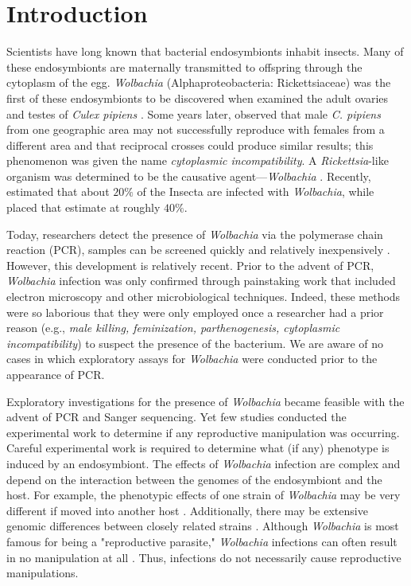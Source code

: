 \documentclass{frontiersSCNS}
\begin{document}
\section{Introduction}
Scientists have long known that bacterial endosymbionts inhabit insects. Many of these endosymbionts are maternally transmitted to offspring through the cytoplasm of the egg. \textit{Wolbachia} (Alphaproteobacteria: Rickettsiaceae) was the first of these endosymbionts to be discovered when \citet{Hertig:1924wy} examined the adult ovaries and testes of \textit{Culex pipiens} \citep[hence the specific epithet of \textit{Wolbachia pipientis}; ][]{Hertig:1936}. Some years later, \citet{Yen:1971tc} observed that male \textit{C. pipiens} from one geographic area may not successfully reproduce with females from a different area and that reciprocal crosses could produce similar results; this phenomenon was given the name \textit{cytoplasmic incompatibility}. A \textit{Rickettsia}-like organism was determined to be the causative agent---\textit{Wolbachia} \citep{Yen:1973vx}. Recently, \cite{Hilgenboecker:2008aa} estimated that about $20\%$ of the Insecta  are infected with \emph{Wolbachia}, while \cite{Zug:2012bi}  placed that estimate at roughly $40\%$. 

Today, researchers detect the presence of \textit{Wolbachia} via the polymerase chain reaction (PCR), samples can be screened quickly and relatively inexpensively \citep{Baldo:2006p7025,Simoes:2011p11073}. However, this development is relatively recent. Prior to the advent of PCR, \textit{Wolbachia} infection was only confirmed through painstaking work that included electron microscopy and other microbiological techniques. Indeed, these methods were so laborious that they were only employed once a researcher had a prior reason (e.g., \emph{male killing, feminization, parthenogenesis, cytoplasmic incompatibility}) to suspect the presence of the bacterium. We are aware of no cases in which exploratory assays for \textit{Wolbachia} were conducted prior to the appearance of PCR. 

Exploratory investigations for the presence of \textit{Wolbachia} became feasible with the advent of PCR and Sanger sequencing. Yet few studies conducted the experimental work to determine if any reproductive manipulation was occurring. Careful experimental work is required to determine what (if any) phenotype is induced by an endosymbiont. The effects of \textit{Wolbachia} infection are complex and depend on the interaction between the genomes of the endosymbiont and the host. For example, the phenotypic effects of one strain of \textit{Wolbachia} may be very different if moved into another host \citep{
Rigaud:2001fv,Hoffmann:2011p11474}. Additionally, there may be extensive genomic differences between closely related strains  \citep{Ishmael:2009p8257}. Although \emph{Wolbachia} is most famous for being a "reproductive parasite," \textit{Wolbachia} infections can often result in no manipulation at all  \citep{Hamm:2014cv,Zhang:2010jl,Zhang:2013eo}. Thus, infections do not necessarily cause reproductive manipulations. 
\end{document}
